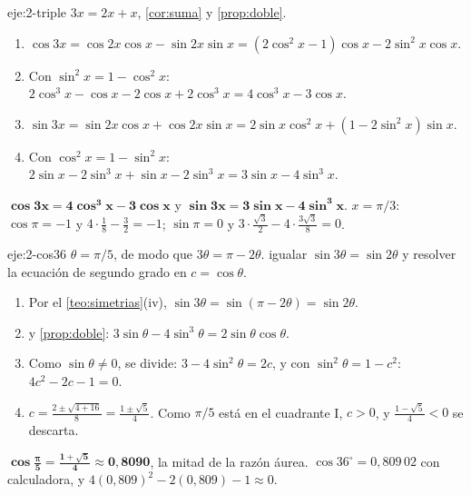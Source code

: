 \begin{solucion}{eje:2-triple}
\planteamiento $3x=2x+x$, \cref{cor:suma} y \cref{prop:doble}.
\pasos
\begin{enumerate}[label=\arabic*.]
  \item $\cos3x=\cos2x\cos x-\sin2x\sin x=(2\cos^{2}x-1)\cos x-2\sin^{2}x\cos x$.
  \item Con $\sin^{2}x=1-\cos^{2}x$: $2\cos^{3}x-\cos x-2\cos x+2\cos^{3}x=4\cos^{3}x-3\cos x$.
  \item $\sin3x=\sin2x\cos x+\cos2x\sin x=2\sin x\cos^{2}x+(1-2\sin^{2}x)\sin x$.
  \item Con $\cos^{2}x=1-\sin^{2}x$: $2\sin x-2\sin^{3}x+\sin x-2\sin^{3}x=3\sin x-4\sin^{3}x$.
\end{enumerate}
\resultado $\mathbf{\cos3x=4\cos^{3}x-3\cos x}$ y $\mathbf{\sin3x=3\sin x-4\sin^{3}x}$.
\comprobacion $x=\pi/3$: $\cos\pi=-1$ y $4\cdot\frac18-\frac32=-1$; $\sin\pi=0$ y $3\cdot\frac{\sqrt3}{2}-4\cdot\frac{3\sqrt3}{8}=0$.
\end{solucion}

\begin{solucion}{eje:2-cos36}
\datos $\theta=\pi/5$, de modo que $3\theta=\pi-2\theta$.
\planteamiento igualar $\sin3\theta=\sin2\theta$ y resolver la ecuación de segundo grado en $c=\cos\theta$.
\pasos
\begin{enumerate}[label=\arabic*.]
  \item Por el \cref{teo:simetrias}(iv), $\sin3\theta=\sin(\pi-2\theta)=\sin2\theta$.
  \item {} y \cref{prop:doble}: $3\sin\theta-4\sin^{3}\theta=2\sin\theta\cos\theta$.
  \item Como $\sin\theta\ne0$, se divide: $3-4\sin^{2}\theta=2c$, y con $\sin^{2}\theta=1-c^{2}$: $4c^{2}-2c-1=0$.
  \item $c=\frac{2\pm\sqrt{4+16}}{8}=\frac{1\pm\sqrt5}{4}$. Como $\pi/5$ está en el cuadrante I, $c>0$, y $\frac{1-\sqrt5}{4}<0$ se descarta.
\end{enumerate}
\resultado $\mathbf{\cos\frac{\pi}{5}=\frac{1+\sqrt5}{4}\approx0{,}8090}$, la mitad de la razón áurea.
\comprobacion $\cos36^{\circ}=0{,}809\,02$ con calculadora, y $4(0{,}809)^{2}-2(0{,}809)-1\approx0$.
\end{solucion}

